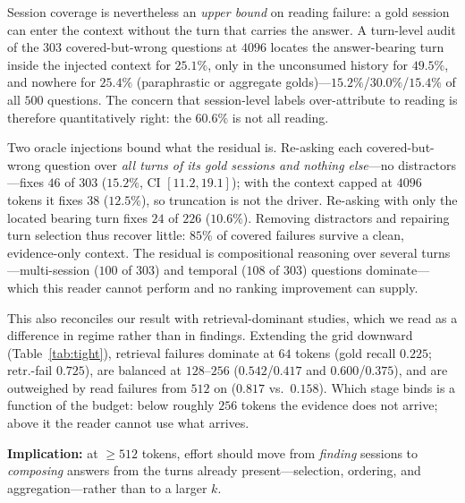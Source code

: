 \documentclass{article} %
\begin{document}
Session coverage is nevertheless an \emph{upper bound} on reading failure: a gold session
can enter the context without the turn that carries the answer. A turn-level audit of the
$303$ covered-but-wrong questions at $4096$ locates the answer-bearing turn inside the
injected context for $25.1\%$, only in the unconsumed history for $49.5\%$, and nowhere for
$25.4\%$ (paraphrastic or aggregate golds)---$15.2\%$/$30.0\%$/$15.4\%$ of all $500$
questions. The concern that session-level labels over-attribute to reading is therefore
quantitatively right: the $60.6\%$ is not all reading.

Two oracle injections bound what the residual is. Re-asking each covered-but-wrong question
over \emph{all turns of its gold sessions and nothing else}---no distractors---fixes $46$ of
$303$ ($15.2\%$, CI $[11.2,19.1]$); with the context capped at $4096$ tokens it fixes $38$
($12.5\%$), so truncation is not the driver. Re-asking with only the located bearing turn
fixes $24$ of $226$ ($10.6\%$). Removing distractors and repairing turn selection thus
recover little: $85\%$ of covered failures survive a clean, evidence-only context. The
residual is compositional reasoning over several turns---multi-session ($100$ of $303$) and
temporal ($108$ of $303$) questions dominate---which this reader cannot perform and no
ranking improvement can supply.

This also reconciles our result with retrieval-dominant studies, which we read as a
difference in regime rather than in findings. Extending the grid downward
(Table~\ref{tab:tight}), retrieval failures dominate at $64$ tokens (gold recall $0.225$;
retr.-fail $0.725$), are balanced at $128$--$256$ ($0.542$/$0.417$ and $0.600$/$0.375$), and
are outweighed by read failures from $512$ on ($0.817$ vs.\ $0.158$). Which stage binds is a
function of the budget: below roughly $256$ tokens the evidence does not arrive; above it the
reader cannot use what arrives.

\textbf{Implication:} at $\geq 512$ tokens, effort should move from \emph{finding} sessions
to \emph{composing} answers from the turns already present---selection, ordering, and
aggregation---rather than to a larger $k$.

\begin{table}[h]
\centering\scriptsize
\caption{Tiny-budget regime (stratified $120$-question subset, same reader): relaxed EM at
$64/128/256$ tokens, with the $512$ cell of the main grid for reference. Failure
decomposition for these cells is given in the text. Source \texttt{tables500/tight.tex}.}
\label{tab:tight}

\end{table}
\end{document}
